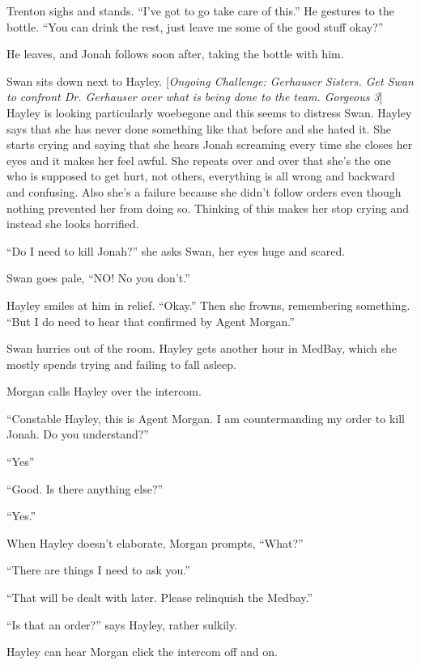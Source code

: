 Trenton sighs and stands.  ``I've got to go take care of this.''  He gestures to the bottle.  ``You can drink the rest, just leave me some of the good stuff okay?''

He leaves, and Jonah follows soon after, taking the bottle with him.



Swan sits down next to Hayley.   {[}\textit{Ongoing Challenge: Gerhauser Sisters.  Get Swan to confront Dr. Gerhauser over what is being done to the team.  Gorgeous 3}{]}  Hayley is looking particularly woebegone and this seems to distress Swan.  Hayley says that she has never done something like that before and she hated it.  She starts crying and saying that she hears Jonah screaming every time she closes her eyes and it makes her feel awful.  She repeats over and over that she's the one who is supposed to get hurt, not others, everything is all wrong and backward and confusing.  Also she's a failure because she didn't follow orders even though nothing prevented her from doing so.  Thinking of this makes her stop crying and instead she looks horrified.

``Do I need to kill Jonah?'' she asks Swan, her eyes huge and scared.

Swan goes pale, ``NO!  No you don't.''

Hayley smiles at him in relief. ``Okay.''  Then she frowns, remembering something. ``But I do need to hear that confirmed by Agent Morgan.''

Swan hurries out of the room.  Hayley gets another hour in MedBay, which she mostly spends trying and failing to fall asleep.



Morgan calls Hayley over the intercom.

``Constable Hayley, this is Agent Morgan.  I am countermanding my order to kill Jonah.  Do you understand?''

``Yes''

``Good.  Is there anything else?''

``Yes.''

When Hayley doesn't elaborate, Morgan prompts, ``What?''

``There are things I need to ask you.''

``That will be dealt with later.  Please relinquish the Medbay.''

``Is that an order?'' says Hayley, rather sulkily.

Hayley can hear Morgan click the intercom off and on.


